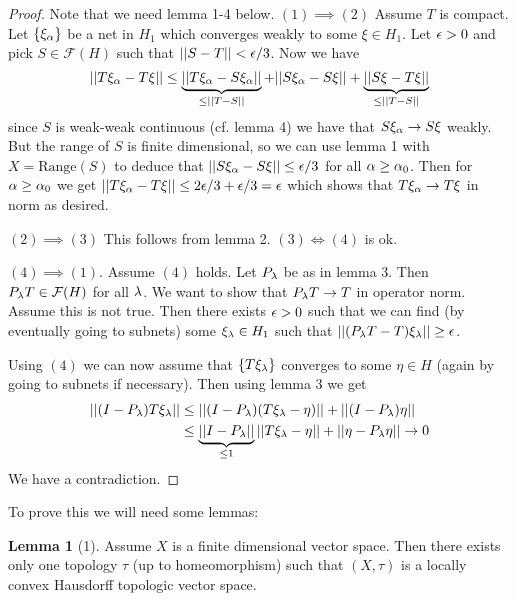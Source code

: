 \documentclass[10pt,english,a4paper]{article}
\theoremstyle{definition}
\newtheorem*{lemma}{Lemma}
\def\Ff{\mathcal{F}}
\begin{document}
\begin{proof}
    Note that we need lemma 1-4 below. 
    $(1)\implies (2)$ Assume $T$ is compact. Let $\{\xi_{\alpha}\}$ be a net in $H_1$ which 
    converges weakly to some $\xi\in H_1$. Let $\epsilon > 0$ and pick 
    $S \in \Ff(H)$ such that $||S-T|| < \epsilon/3$. Now we have 
\[ ||T\xi_{\alpha} - T\xi || \leq \underbrace{||T\xi_{\alpha} - S\xi_{\alpha}||}_{\leq ||T-S||}
+ ||S\xi_{\alpha} - S\xi|| + \underbrace{||S\xi-T\xi||}_{\leq ||T-S||}\]
since $S$ is weak-weak continuous (cf. lemma 4) we have that $S\xi_{\alpha}\to S\xi$ 
weakly. But the range of $S$ is finite dimensional, so we can use lemma 1 with 
$X = \text{Range}(S)$ to deduce that $||S\xi_{\alpha}-S\xi||\leq \epsilon/3$ for all 
$\alpha \geq \alpha_0$. Then for $\alpha \geq \alpha_0$ we get 
$||T\xi_{\alpha} - T\xi|| \leq 2\epsilon/3 + \epsilon/3 = \epsilon$ which shows that 
$T\xi_{\alpha} \to T\xi$ in norm as desired.

$(2)\implies (3)$ This follows from lemma 2. $(3) \iff (4)$ is ok. 

$(4) \implies (1)$. Assume $(4)$ holds. 
Let $P_{\lambda}$ be as in lemma 3. Then $P_{\la}T \in \Ff(H)$ for all $\lambda$. 
We want to show that $P_{\lambda}T \to T$ in operator norm. Assume this is not true. 
Then there exists $\epsilon > 0$ such that we can find
(by eventually going to subnets) some $\xi_{\lambda} \in H_1$ such that $||(P_{\lambda}T-T)\xi_{\lambda}||\geq \epsilon$.

Using $(4)$ we can now assume that $\{T\xi_{\lambda}\}$ converges to some $\eta \in H$
(again by going to subnets if necessary). Then using lemma 3 we get 
\begin{align*}
    ||(I-P_{\lambda})T\xi_{\lambda}|| &\leq 
    ||(I-P_{\lambda})(T\xi_{\lambda}-\eta)|| + ||(I-P_{\lambda})\eta|| \\
    &\leq \underbrace{||I-P_{\lambda}||}_{\leq 1} ||T\xi_{\lambda} -\eta|| +
    ||\eta-P_{\lambda}\eta|| \to 0
\end{align*}
We have  a contradiction. 


 
\end{proof}


To prove this we will need some lemmas:
\begin{lemma}[1]
    Assume $X$ is a finite dimensional vector space. Then there exists only one 
    topology $\tau$ (up to homeomorphism) such that $(X,\tau)$ is a locally 
    convex Hausdorff topologic vector space.
\end{lemma}
\end{document}

